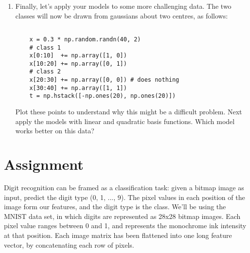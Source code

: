 \documentclass{article}
\begin{document}
\begin{enumerate}
\begin{enumerate}

\item Finally, let's apply your models to some more challenging data. The two classes
will now be drawn from gaussians about two centres, as follows:
\begin{verbatim}

    x = 0.3 * np.random.randn(40, 2)
    # class 1
    x[0:10]  += np.array([1, 0])
    x[10:20] += np.array([0, 1])
    # class 2
    x[20:30] += np.array([0, 0]) # does nothing
    x[30:40] += np.array([1, 1])
    t = np.hstack([-np.ones(20), np.ones(20)])
\end{verbatim}
Plot these points to understand why this might be a difficult problem. Next apply the models
with linear and quadratic basis functions. Which model works better on this data? 
\end{enumerate}
\end{enumerate}

\part{Assignment}


Digit recognition can be framed as a classification task: given a bitmap image as input, predict the digit type (0, 1, ..., 9). The pixel values in each position of the image form our features, and the digit type is the class. We'll be using the MNIST data set, in which digits are represented as 28x28 bitmap images. Each pixel value ranges between 0 and 1, and represents the monochrome ink intensity at that position. Each image matrix has been flattened into one long feature vector, by concatenating each row of pixels.
\end{document}
